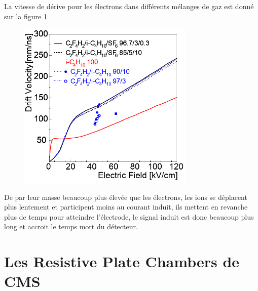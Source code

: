 La vitesse de dérive pour les électrons dans différents mélanges de gaz est donné sur la figure \ref{drift} \cite{Riegler:570462}

\begin{figure}[h!]
	\centering
	\includegraphics[width=0.75\textwidth]{RPC/drift.png}
	\label{drift}
\end{figure}

De par leur masse beaucoup plus élevée que les électrons, les ions se déplacent plus lentement et participent moins au courant induit, ils mettent en revanche plus de temps pour atteindre l'électrode, le signal induit est donc beaucoup plus long et accroit le temps mort du détecteur.

\section{Les Resistive Plate Chambers de CMS}
